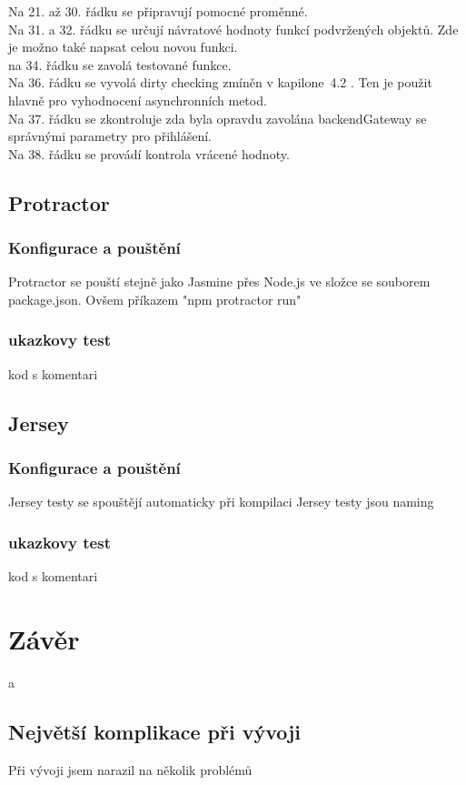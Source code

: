 \documentclass[czech,master,public,dept460,male,cpdeclaration,twoside]{diploma}
\begin{document}
Na 21. až 30. řádku se připravují pomocné proměnné.\\
Na 31. a 32. řádku se určují návratové hodnoty funkcí podvržených objektů. Zde je možno také napsat celou novou funkci.\\
na 34. řádku se zavolá testované funkce.\\
Na 36. řádku se vyvolá dirty checking zmíněn v kapilone~4.2 . Ten je použit hlavně pro vyhodnocení asynchronních metod.\\
Na 37. řádku se zkontroluje zda byla opravdu zavolána backendGateway se správnými parametry pro přihlášení.\\
Na 38. řádku se provádí kontrola vrácené hodnoty.\\

\subsection{Protractor}
\subsubsection{Konfigurace a pouštění}
Protractor se pouští stejně jako Jasmine přes Node.js ve složce se souborem package.json. Ovšem příkazem "npm protractor run"

\subsubsection{ukazkovy test}
kod s komentari


\subsection{Jersey}
\subsubsection{Konfigurace a pouštění}
Jersey testy se spouštějí automaticky při kompilaci 
Jersey testy jsou 
naming 

\subsubsection{ukazkovy test}
kod s komentari



\section{Závěr}
a

\subsection{Největší komplikace při vývoji}
Při vývoji jsem narazil na několik problémů
\end{document}
